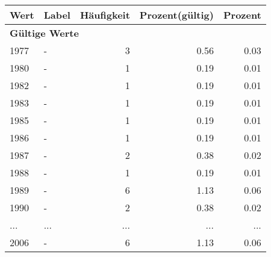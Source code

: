      \begin{longtable}{lXrrr}
     \toprule
     \textbf{Wert} & \textbf{Label} & \textbf{Häufigkeit} & \textbf{Prozent(gültig)} & \textbf{Prozent} \\
     \endhead
     \midrule
     \multicolumn{5}{l}{\textbf{Gültige Werte}}\\
        1977 & \multicolumn{1}{X}{-} & %
          \num{3} &
          \num[round-mode=places,round-precision=2]{0,56} &
          \num[round-mode=places,round-precision=2]{0,03} \\
        1980 & \multicolumn{1}{X}{-} & %
          \num{1} &
          \num[round-mode=places,round-precision=2]{0,19} &
          \num[round-mode=places,round-precision=2]{0,01} \\
        1982 & \multicolumn{1}{X}{-} & %
          \num{1} &
          \num[round-mode=places,round-precision=2]{0,19} &
          \num[round-mode=places,round-precision=2]{0,01} \\
        1983 & \multicolumn{1}{X}{-} & %
          \num{1} &
          \num[round-mode=places,round-precision=2]{0,19} &
          \num[round-mode=places,round-precision=2]{0,01} \\
        1985 & \multicolumn{1}{X}{-} & %
          \num{1} &
          \num[round-mode=places,round-precision=2]{0,19} &
          \num[round-mode=places,round-precision=2]{0,01} \\
        1986 & \multicolumn{1}{X}{-} & %
          \num{1} &
          \num[round-mode=places,round-precision=2]{0,19} &
          \num[round-mode=places,round-precision=2]{0,01} \\
        1987 & \multicolumn{1}{X}{-} & %
          \num{2} &
          \num[round-mode=places,round-precision=2]{0,38} &
          \num[round-mode=places,round-precision=2]{0,02} \\
        1988 & \multicolumn{1}{X}{-} & %
          \num{1} &
          \num[round-mode=places,round-precision=2]{0,19} &
          \num[round-mode=places,round-precision=2]{0,01} \\
        1989 & \multicolumn{1}{X}{-} & %
          \num{6} &
          \num[round-mode=places,round-precision=2]{1,13} &
          \num[round-mode=places,round-precision=2]{0,06} \\
        1990 & \multicolumn{1}{X}{-} & %
          \num{2} &
          \num[round-mode=places,round-precision=2]{0,38} &
          \num[round-mode=places,round-precision=2]{0,02} \\
       ... & ... & ... & ... & ... \\
        2006 & \multicolumn{1}{X}{-} & %
          \num{6} &
          \num[round-mode=places,round-precision=2]{1,13} &
          \num[round-mode=places,round-precision=2]{0,06} \\


\end{longtable}
